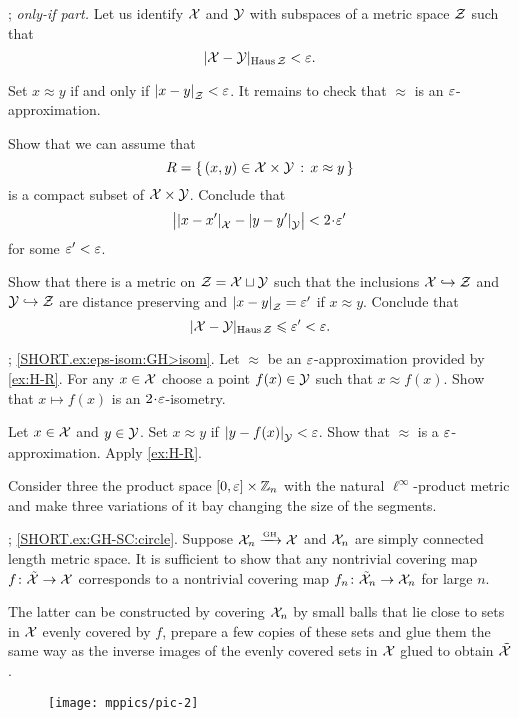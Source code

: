 \parbf{\ref{ex:H-R}}; \textit{only-if part.}
Let us identify $\mathcal{X}$ and $\mathcal{Y}$ with subspaces of a metric space $\mathcal{Z}$ such that 
\[|\mathcal{X}-\mathcal{Y}|_{\operatorname{\rm Haus}\nolimits \mathcal{Z}}<\varepsilon.\]

Set $x\approx y$ if and only if $\dist{x}{y}{\spc{Z}}<\eps$.
It remains to check that $\approx$ is an $\varepsilon$-approximation.

Show that we can assume that 
\[R=\left\{\,{(x,y)\in\mathcal{X}\times\mathcal{Y}}\,:\,{x\approx y}\,\right\}\] is a compact subset of $\mathcal{X}\times\mathcal{Y}$.
Conclude that
\[\bigl|\dist{x}{x'}{\spc{X}}-\dist{y}{y'}{\spc{Y}}\bigr|<2\cdot\eps'\]
for some $\varepsilon'<\varepsilon$.

Show that there is a metric on $\mathcal{Z}=\mathcal{X}\sqcup\mathcal{Y}$ such that the inclusions $\mathcal{X}\hookrightarrow\mathcal{Z}$ and
$\mathcal{Y}\hookrightarrow\mathcal{Z}$ are distance preserving and $\dist{x}{y}{\spc{Z}}=\eps'$ if $x\approx y$.
Conclude that 
\[|\mathcal{X}-\mathcal{Y}|_{\operatorname{\rm Haus}\nolimits \mathcal{Z}}\leqslant\varepsilon'<\varepsilon.\]

\parbf{\ref{ex:eps-isom}};
\ref{SHORT.ex:eps-isom:GH>isom}.
Let $\approx$ be an $\varepsilon$-approximation provided by \ref{ex:H-R}.
For any $x\in\mathcal{X}$ choose a point $f(x)\in\mathcal{Y}$ such that $x\approx f(x)$.
Show that $x\mapsto f(x)$ is an $2\cdot\eps$-isometry.

Let $x\in\mathcal{X}$ and $y\in\mathcal{Y}$.
Set $x\approx y$ if $\dist{y}{f(x)}{\spc{Y}}<\eps$.
Show that $\approx$ is a $\varepsilon$-approximation. 
Apply \ref{ex:H-R}.

Consider three the product space $[0,\varepsilon]\times \mathbb{Z}_n$ with the natural $\ell^\infty$-product metric and make three variations of it bay changing the size of the segments.

\parbf{\ref{ex:GH-SC}}; \ref{SHORT.ex:GH-SC:circle}.
Suppose $\mathcal{X}_n\xrightarrow{\mbox{\tiny\rm GH}} \mathcal{X}$ and $\mathcal{X}_n$ are simply connected length metric space.
It is sufficient to show that any nontrivial covering map $f\colon\tilde{\mathcal{X}}\to \mathcal{X}$ corresponds to a nontrivial covering map $f_n\colon\tilde{\mathcal{X}}_n\to \mathcal{X}_n$ for large $n$.

The latter can be constructed by covering $\mathcal{X}_n$ by small balls that lie close to sets in $\mathcal{X}$ evenly covered by $f$, prepare a few copies of these sets and glue them the same way as the inverse images of the evenly covered sets in $\mathcal{X}$ glued to obtain $\tilde{\mathcal{X}}$.

\begin{wrapfigure}[6]{r}{40 mm}
\vskip-6mm
\centering
\texttt{[image: mppics/pic-2]}
\end{wrapfigure}

